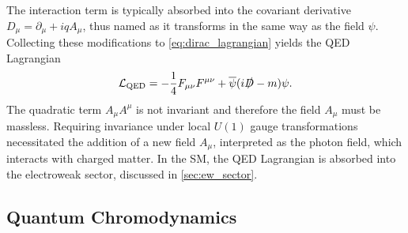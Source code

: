 The interaction term is typically absorbed into the covariant derivative $D_\mu = \partial_\mu + i q A_\mu$, thus named as it transforms in the same way as the field $\psi$.
Collecting these modifications to \cref{eq:dirac_lagrangian} yields the QED Lagrangian
%
\begin{equation}\label{eq:qed_lagrangian}
  \mathcal{L}_{\textnormal{QED}} = -\frac{1}{4} F_{\mu\nu} F^{\mu\nu} + \overline{\psi} (i \slashed{D} - m )\psi .
\end{equation}
%
The quadratic term $A_\mu A^\mu$ is not invariant and therefore the field $A_\mu$ must be massless.
Requiring invariance under local $U(1)$ gauge transformations necessitated the addition of a new field $A_\mu$, interpreted as the photon field, which interacts with charged matter.
In the SM, the QED Lagrangian is absorbed into the electroweak sector, discussed in \cref{sec:ew_sector}.


\subsection{Quantum Chromodynamics}\label{sec:qcd}

